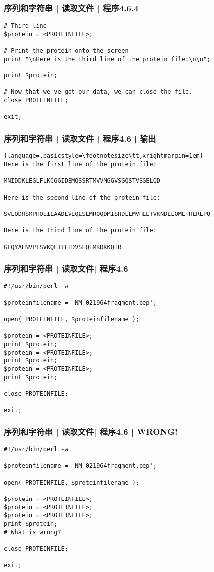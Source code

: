\begin{frame}[fragile]
  \frametitle{序列和字符串 | 读取文件 | 程序4.6.4}
\begin{lstlisting}[firstnumber=35]
# Third line
$protein = <PROTEINFILE>;

# Print the protein onto the screen
print "\nHere is the third line of the protein file:\n\n";

print $protein;

# Now that we've got our data, we can close the file.
close PROTEINFILE;

exit;
\end{lstlisting}
\end{frame}

\begin{frame}[fragile]
  \frametitle{序列和字符串 | 读取文件 | 程序4.6 | 输出}
\begin{lstlisting}[language=,basicstyle=\footnotesize\tt,xrightmargin=1em]
Here is the first line of the protein file:

MNIDDKLEGLFLKCGGIDEMQSSRTMVVMGGVSGQSTVSGELQD

Here is the second line of the protein file:

SVLQDRSMPHQEILAADEVLQESEMRQQDMISHDELMVHEETVKNDEEQMETHERLPQ

Here is the third line of the protein file:

GLQYALNVPISVKQEITFTDVSEQLMRDKKQIR
\end{lstlisting}
\end{frame}

\begin{frame}[fragile]
  \frametitle{序列和字符串 | 读取文件| \alert{程序4.6}}
\begin{lstlisting}[basicstyle=\small\tt]
#!/usr/bin/perl -w

$proteinfilename = 'NM_021964fragment.pep';

open( PROTEINFILE, $proteinfilename );

$protein = <PROTEINFILE>;
print $protein;
$protein = <PROTEINFILE>;
print $protein;
$protein = <PROTEINFILE>;
print $protein;

close PROTEINFILE;

exit;
\end{lstlisting}
\end{frame}

\begin{frame}[fragile]
  \frametitle{序列和字符串 | 读取文件| 程序4.6 | WRONG!}
\begin{lstlisting}[basicstyle=\small\tt]
#!/usr/bin/perl -w

$proteinfilename = 'NM_021964fragment.pep';

open( PROTEINFILE, $proteinfilename );

$protein = <PROTEINFILE>;
$protein = <PROTEINFILE>;
$protein = <PROTEINFILE>;
print $protein;
# What is wrong?

close PROTEINFILE;

exit;
\end{lstlisting}
\end{frame}

